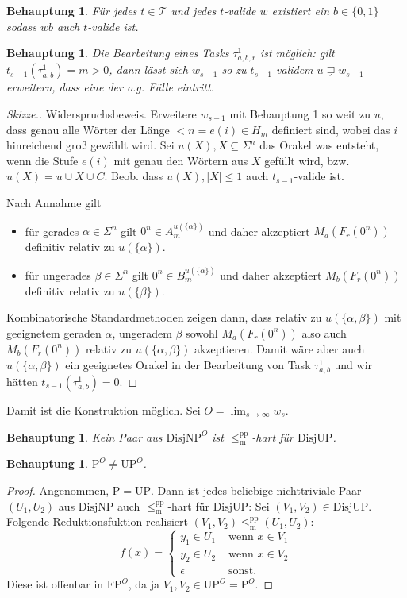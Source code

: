\documentclass[nofonts]{uebung}
\newtheorem{claim}[theorem]{Behauptung}
\def\P{\ensuremath{\mathrm{P}}}
\def\FP{\ensuremath{\mathrm{FP}}}
\def\UP{\ensuremath{\mathrm{UP}}}
\def\DisjNP{\ensuremath{\mathrm{DisjNP}}}
\def\DisjUP{\ensuremath{\mathrm{DisjUP}}}
\def\leqmpp{\ensuremath{\leq_\mathrm{m}^\mathrm{pp}}}
\begin{document}
\begin{claim}
    Für jedes $t\in\mathcal T$ und jedes $t$-valide $w$ existiert ein $b\in\{0,1\}$ sodass $wb$ auch $t$-valide ist.
\end{claim}

\begin{claim}
    Die Bearbeitung eines Tasks $\tau^1_{a,b,r}$ ist möglich: gilt $t_{s-1}(\tau^1_{a,b})=m>0$, dann lässt sich $w_{s-1}$ so zu $t_{s-1}$-validem $u\sqsupsetneq w_{s-1}$ erweitern, dass eine der o.g. Fälle eintritt.
\end{claim}
\begin{proof}[Skizze.]
    Widerspruchsbeweis. Erweitere $w_{s-1}$ mit Behauptung 1 so weit zu $u$, dass genau alle Wörter der Länge $<n=e(i)\in H_m$ definiert sind, wobei das $i$ hinreichend groß gewählt wird. Sei $u(X), X\subseteq \Sigma^n$ das Orakel was entsteht, wenn die Stufe $e(i)$ mit genau den Wörtern aus $X$ gefüllt wird, bzw. $u(X)=u\cup X \cup C$. Beob. dass $u(X), |X|\leq 1$ auch $t_{s-1}$-valide ist.

    Nach Annahme gilt
    \begin{itemize}
        \item für gerades $\alpha\in \Sigma^n$ gilt $0^n\in A_m^{u(\{\alpha\})}$ und daher akzeptiert $M_a(F_r(0^n))$ definitiv relativ zu $u(\{\alpha\})$.
        \item für ungerades $\beta\in \Sigma^n$ gilt $0^n\in B_m^{u(\{\alpha\})}$ und daher akzeptiert $M_b(F_r(0^n))$ definitiv relativ zu $u(\{\beta\})$.
    \end{itemize}
    Kombinatorische Standardmethoden zeigen dann, dass relativ zu $u(\{\alpha,\beta\})$ mit geeignetem geraden $\alpha$, ungeradem $\beta$ sowohl $M_a(F_r(0^n))$ also auch $M_b(F_r(0^n))$ relativ zu $u(\{\alpha,\beta\})$ akzeptieren.
    Damit wäre aber auch $u(\{\alpha,\beta\})$ ein geeignetes Orakel in der Bearbeitung von Task $\tau^1_{a,b}$ und wir hätten $t_{s-1}(\tau^1_{a,b})=0$.
\end{proof}

Damit ist die Konstruktion möglich. Sei $O=\lim_{s\to\infty} w_s$.

\begin{claim}
    Kein Paar aus $\DisjNP^O$ ist $\leqmpp$-hart für $\DisjUP$.
\end{claim}

\begin{claim}
    $\P^O\neq \UP^O$.
\end{claim}
\begin{proof}
    Angenommen, $\P=\UP$. Dann ist jedes beliebige nichttriviale Paar $(U_1, U_2)$ aus $\DisjNP$ auch $\leqmpp$-hart für $\DisjUP$:
    Sei $(V_1, V_2)\in\DisjUP$. Folgende Reduktionsfuktion realisiert $(V_1,V_2)\leqmpp (U_1,U_2)$:
    \[
        f(x) = \begin{cases} y_1\in U_1 & \text{ wenn $x\in V_1$} \\y_2\in U_2 & \text{ wenn $x\in V_2$} \\ \epsilon & \text{ sonst}. \end{cases}
    \]
    Diese ist offenbar in $\FP^O$, da ja $V_1, V_2\in\UP^O=\P^O$. 
\end{proof}
\end{document}

